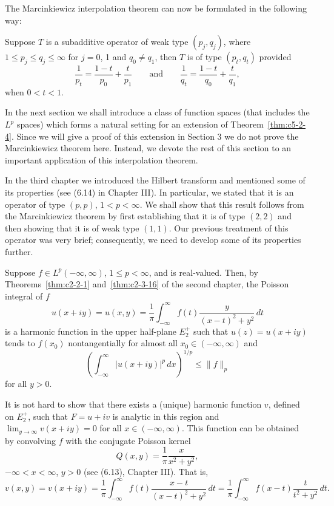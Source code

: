 The Marcinkiewicz interpolation theorem can now be formulated in the following
way:

\begin{theorem}\label{thm:c5-2-4}
Suppose $T$ is a subadditive operator of weak type $(p_{j}, q_{j})$, where
$1 \leq p_{j} \leq q_{j} \leq \infty$ for $j = 0$, 1 and $q_{0} \neq q_{1}$,
then $T$ is of type $(p_{t}, q_{t})$ provided
\[
\frac{1}{p_{t}}=\frac{1-t}{p_{0}}+\frac{t}{p_{1}}
\qquad\text{and}\qquad
\frac{1}{q_{t}}=\frac{1-t}{q_{0}}+\frac{t}{q_{1}},
\]
when $0 < t < 1$.
\end{theorem}

In the next section we shall introduce a class of function spaces (that
includes the $L^{p}$ spaces) which forms a natural setting for an extension of
Theorem~\ref{thm:c5-2-4}. Since we will give a proof of this extension in
Section 3 we do not prove the Marcinkiewicz theorem here. Instead, we devote
the rest of this section to an important application of this interpolation
theorem.

In the third chapter we introduced the Hilbert transform and mentioned some of
its properties (see (6.14) in Chapter III). In particular, we
stated that it is an operator of type $(p, p)$, $1 < p < \infty$. We shall show
that this result follows from the Marcinkiewicz theorem by first establishing
that it is of type $(2, 2)$ and then showing that it is of weak type $(1, 1)$.
Our previous treatment of this operator was very brief; consequently, we need
to develop some of its properties further.

Suppose $f \in L^{p}(-\infty, \infty)$, $1 \leq p < \infty$, and is
real-valued. Then, by Theorems~\ref{thm:c2-2-1} and~\ref{thm:c2-3-16} of the
second chapter, the Poisson integral of $f$
\[
u(x+iy)=u(x,y)=\frac{1}{\pi}\int_{-\infty}^{\infty}f(t)
\frac{y}{(x-t)^{2}+y^{2}}\,dt
\]
is a harmonic function in the upper half-plane $E_{2}^{+}$ such that
$u(z) = u(x + iy)$ tends to $f(x_{0})$ nontangentially for almost all
$x_{0} \in (-\infty, \infty)$ and
\begin{equation}\label{eq:c5-2-5}
\left(\int_{-\infty}^{\infty}|u(x+iy)|^{p}\,dx\right)^{1/p}\leq\|f\|_{p}
\end{equation}
for all $y > 0$.

It is not hard to show that there exists a (unique) harmonic function $v$,
defined on $E_{2}^{+}$, such that $F = u + iv$ is analytic in this region and
$\lim_{y \to \infty}v(x + iy) = 0$ for all $x \in (-\infty, \infty)$. This
function can be obtained by convolving $f$ with the conjugate Poisson kernel
\[
Q(x,y)=\frac{1}{\pi}\frac{x}{x^{2}+y^{2}},
\]
$-\infty < x < \infty$, $y > 0$ (see (6.13), Chapter III). That is,
\[
v(x,y)=v(x+iy)=\frac{1}{\pi}\int_{-\infty}^{\infty}f(t)
\frac{x-t}{(x-t)^{2}+y^{2}}\,dt
=\frac{1}{\pi}\int_{-\infty}^{\infty}f(x-t)\frac{t}{t^{2}+y^{2}}\,dt.
\]

